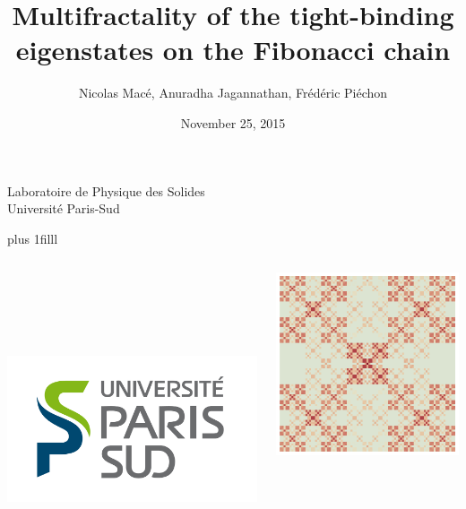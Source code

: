 \documentclass[xcolor=x11names,compress,professionalfonts]{beamer}
\newcommand{\btVFill}{\vskip0pt plus 1filll}%
\renewcommand{\(}{\begin{columns}}
\renewcommand{\)}{\end{columns}}
\newcommand{\<}[1]{\begin{column}{#1}}
\renewcommand{\>}{\end{column}}
\begin{document}
\begin{frame}
\title{Multifractality of the tight-binding eigenstates on the Fibonacci chain}


\author{ Nicolas Macé, Anuradha Jagannathan, Frédéric Piéchon}

\institute %
{
  Laboratoire de Physique des Solides\\
  Université Paris-Sud
}

\date{November 25, 2015}

\titlepage

\btVFill
\begin{columns}
\begin{column}{2cm}
~\\
~\\
~\\
~\\
\raggedright
\includegraphics[scale=.15]{LogoUPSUD.png}
\end{column}
\begin{column}{6cm}
\centering
\includegraphics[width=.5\textwidth]{illustration.pdf}

\end{column}
\end{columns}
\end{frame}
\end{document}

